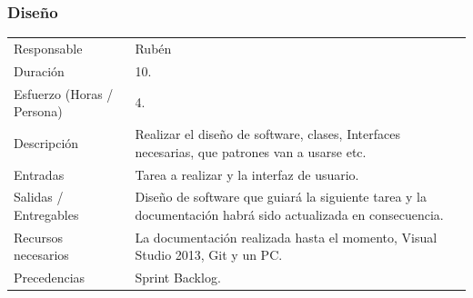 \subsubsection{Dise\~{n}o}
\begin{table}[H]
    \begin{center}
        \begin{tabular}{l p{8cm}}
            Responsable                           & Rub\'{e}n \\
            Duraci\'{o}n                          & 10. \\ 
            Esfuerzo (Horas / Persona)            & 4. \\
            Descripci\'{o}n                       & Realizar el diseño de software, clases, Interfaces necesarias, que patrones van a usarse etc. \\
            Entradas                              & Tarea a realizar y la interfaz de usuario.\\
            Salidas / Entregables                 & Dise\~{n}o de software que guiar\'{a} la siguiente tarea y la documentaci\'{o}n
                                                    habr\'{a} sido actualizada en consecuencia. \\
            Recursos necesarios                   & La documentaci\'{o}n realizada hasta el momento, Visual Studio 2013, Git y un PC. \\
            Precedencias                          & Sprint Backlog. \\
        \end{tabular}
    \end{center}
    
\end{table}

